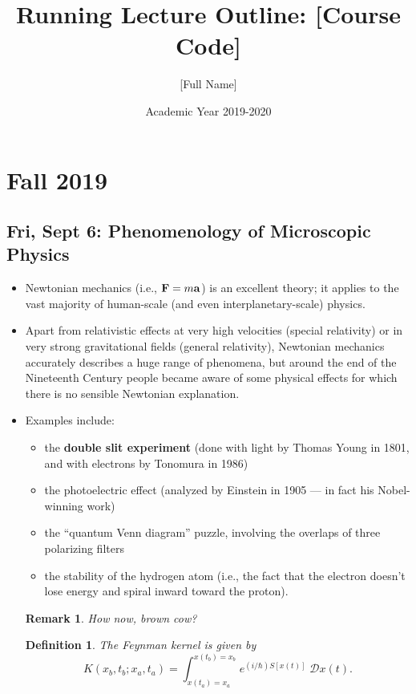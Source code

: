\documentclass[10pt, oneside]{article}
\title{Running Lecture Outline: [Course Code]}
\author{[Full Name]}
\date{Academic Year 2019-2020}
\newtheorem{defn}{Definition}
\newtheorem{rem}{Remark}
\begin{document}
\maketitle
\tableofcontents

\vspace{.25in}

\section{Fall 2019}

\subsection{Fri, Sept 6: Phenomenology of Microscopic Physics}

\begin{itemize}

	\item Newtonian mechanics (i.e., ${\bf F} = m{\bf a}$) is an excellent theory; it applies to the vast majority of human-scale (and even interplanetary-scale) physics.

	\item Apart from relativistic effects at very high velocities (special relativity) or in very strong gravitational fields (general relativity), Newtonian mechanics accurately describes a huge range of phenomena, but around the end of the Nineteenth Century people became aware of some physical effects for which there is no sensible Newtonian explanation.

	\item Examples include:
	      \begin{itemize}
		      \item the {\bf double slit experiment} (done with light by Thomas Young in 1801, and with electrons by Tonomura in 1986)
		      \item the photoelectric effect (analyzed by Einstein in 1905 --- in fact his Nobel-winning work)
		      \item the ``quantum Venn diagram'' puzzle, involving the overlaps of three polarizing filters
		      \item the stability of the hydrogen atom (i.e., the fact that the electron doesn't lose energy and spiral inward toward the proton).
	      \end{itemize}

	      \begin{rem}
		      How now, brown cow?
	      \end{rem}

	      \begin{defn}
		      The {\em Feynman kernel} is given by
		      \[ K(x_b, t_b; x_a, t_a) = \int_{x(t_a) = x_a}^{x(t_b) = x_b} e^{(i/\hbar) S[x(t)]} \; \mathcal{D}x(t). \]
	      \end{defn}

\end{itemize}
\end{document}
